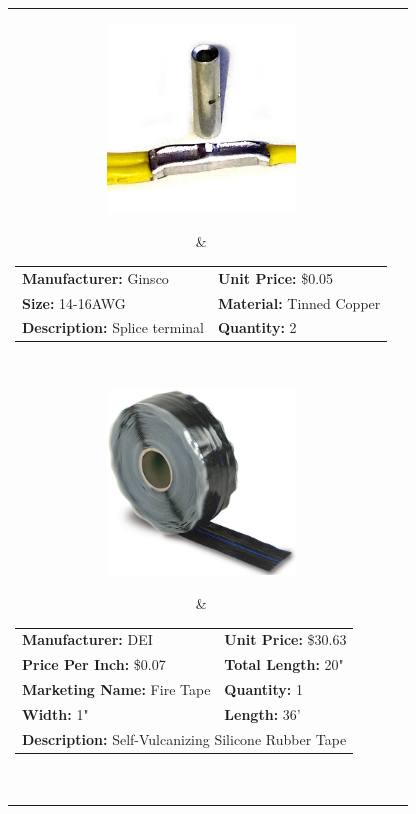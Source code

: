 \documentclass[12pt,letterpaper]{article}
\begin{document}
\begin{longtable}{c l}
\parbox[c]{5cm}{\includegraphics[width=5cm]{splice-terminal.jpg} }
& \begin{tabular}{l l}
\textbf{Manufacturer:} Ginsco & \textbf{Unit Price:} \$0.05 \\
\textbf{Size:} 14-16AWG & \textbf{Material:} Tinned Copper \\
\textbf{Description:} Splice terminal & \textbf{Quantity:} 2 \\
\end{tabular} \\

\parbox[c]{5cm}{\includegraphics[width=5cm]{firetape.jpg} }
& \begin{tabular}{l l}
\textbf{Manufacturer:} DEI & \textbf{Unit Price:} \$30.63 \\
\textbf{Price Per Inch:} \$0.07 & \textbf{Total Length:} 20" \\
\textbf{Marketing Name:} Fire Tape & \textbf{Quantity:} 1 \\
\textbf{Width:} 1" & \textbf{Length:} 36' \\
\multicolumn{2}{p{10cm}}{\textbf{Description:} Self-Vulcanizing Silicone Rubber Tape} \\
\end{tabular} \\


\end{longtable}
\end{document}
